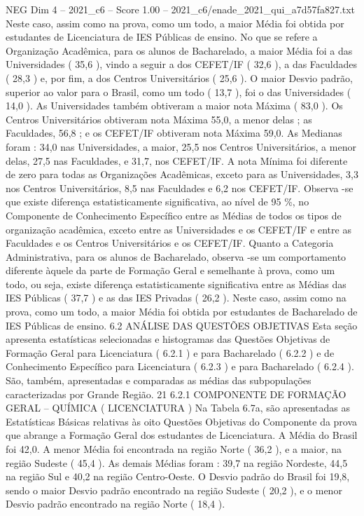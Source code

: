 \begin{textsample}{NEG Dim 4 – 2021\_c6 – Score 1.00 – 2021\_c6/enade\_2021\_qui\_a7d57fa827.txt}
Neste caso, assim como na prova, como um todo, a maior Média foi obtida por estudantes de Licenciatura de IES Públicas de ensino.
No que se refere a Organização Acadêmica, para os alunos de Bacharelado, a maior Média foi a das Universidades ( 35,6 ), vindo a seguir a dos CEFET/IF ( 32,6 ), a das Faculdades ( 28,3 ) e, por fim, a dos Centros Universitários ( 25,6 ).
O maior Desvio padrão, superior ao valor para o Brasil, como um todo ( 13,7 ), foi o das Universidades ( 14,0 ).
As Universidades também obtiveram a maior nota Máxima ( 83,0 ).
Os Centros Universitários obtiveram nota Máxima 55,0, a menor delas ; as Faculdades, 56,8 ; e os CEFET/IF obtiveram nota Máxima 59,0.
As Medianas foram : 34,0 nas Universidades, a maior, 25,5 nos Centros Universitários, a menor delas, 27,5 nas Faculdades, e 31,7, nos CEFET/IF.
A nota Mínima foi diferente de zero para todas as Organizações Acadêmicas, exceto para as Universidades, 3,3 nos Centros Universitários, 8,5 nas Faculdades e 6,2 nos CEFET/IF.
Observa -se que existe diferença estatisticamente significativa, ao nível de 95 \%, no Componente de Conhecimento Específico entre as Médias de todos os tipos de organização acadêmica, exceto entre as Universidades e os CEFET/IF e entre as Faculdades e os Centros Universitários e os CEFET/IF.
Quanto a Categoria Administrativa, para os alunos de Bacharelado, observa -se um comportamento diferente àquele da parte de Formação Geral e semelhante à prova, como um todo, ou seja, existe diferença estatisticamente significativa entre as Médias das IES Públicas ( 37,7 ) e as das IES Privadas ( 26,2 ).
Neste caso, assim como na prova, como um todo, a maior Média foi obtida por estudantes de Bacharelado de IES Públicas de ensino. 6.2 ANÁLISE DAS QUESTÕES OBJETIVAS Esta seção apresenta estatísticas selecionadas e histogramas das Questões Objetivas de Formação Geral para Licenciatura ( 6.2.1 ) e para Bacharelado ( 6.2.2 ) e de Conhecimento Específico para Licenciatura ( 6.2.3 ) e para Bacharelado ( 6.2.4 ).
São, também, apresentadas e comparadas as médias das subpopulações caracterizadas por Grande Região. 21 6.2.1 COMPONENTE DE FORMAÇÃO GERAL – QUÍMICA ( LICENCIATURA ) Na Tabela 6.7a, são apresentadas as Estatísticas Básicas relativas às oito Questões Objetivas do Componente da prova que abrange a Formação Geral dos estudantes de Licenciatura.
A Média do Brasil foi 42,0.
A menor Média foi encontrada na região Norte ( 36,2 ), e a maior, na região Sudeste ( 45,4 ).
As demais Médias foram : 39,7 na região Nordeste, 44,5 na região Sul e 40,2 na região Centro-Oeste.
O Desvio padrão do Brasil foi 19,8, sendo o maior Desvio padrão encontrado na região Sudeste ( 20,2 ), e o menor Desvio padrão encontrado na região Norte ( 18,4 ).

\end{textsample}
